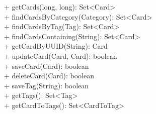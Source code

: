 { 
    + getCards(long, long): Set<Card> \\
    + findCardsByCategory(Category): Set<Card> \\
    + findCardsByTag(Tag): Set<Card> \\
    + findCardsContaining(String): Set<Card> \\
    + getCardByUUID(String): Card \\
    + updateCard(Card, Card): boolean \\
    + saveCard(Card): boolean \\
    + deleteCard(Card): boolean \\
    + saveTag(String): boolean \\
    + getTags(): Set<Tag> \\
    + getCardToTags(): Set<CardToTag> \\
}{}